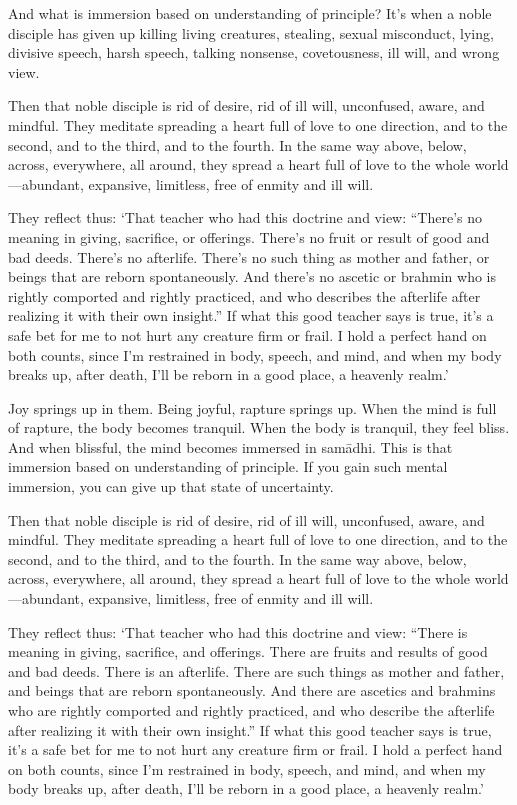 \documentclass[12pt,openany]{book}%
\begin{document}
And what is immersion based on understanding of principle? It’s when a noble disciple has given up killing living creatures, stealing, sexual misconduct, lying, divisive speech, harsh speech, talking nonsense, covetousness, ill will, and wrong view. 

Then that noble disciple is rid of desire, rid of ill will, unconfused, aware, and mindful. They meditate spreading a heart full of love to one direction, and to the second, and to the third, and to the fourth. In the same way above, below, across, everywhere, all around, they spread a heart full of love to the whole world—abundant, expansive, limitless, free of enmity and ill will. 

They reflect thus: ‘That teacher who had this doctrine and view: “There’s no meaning in giving, sacrifice, or offerings. There’s no fruit or result of good and bad deeds. There’s no afterlife. There’s no such thing as mother and father, or beings that are reborn spontaneously. And there’s no ascetic or brahmin who is rightly comported and rightly practiced, and who describes the afterlife after realizing it with their own insight.” If what this good teacher says is true, it’s a safe bet for me to not hurt any creature firm or frail. I hold a perfect hand on both counts, since I’m restrained in body, speech, and mind, and when my body breaks up, after death, I’ll be reborn in a good place, a heavenly realm.’ 

Joy springs up in them. Being joyful, rapture springs up. When the mind is full of rapture, the body becomes tranquil. When the body is tranquil, they feel bliss. And when blissful, the mind becomes immersed in \textsanskrit{samādhi}. This is that immersion based on understanding of principle. If you gain such mental immersion, you can give up that state of uncertainty. 

Then that noble disciple is rid of desire, rid of ill will, unconfused, aware, and mindful. They meditate spreading a heart full of love to one direction, and to the second, and to the third, and to the fourth. In the same way above, below, across, everywhere, all around, they spread a heart full of love to the whole world—abundant, expansive, limitless, free of enmity and ill will. 

They reflect thus: ‘That teacher who had this doctrine and view: “There is meaning in giving, sacrifice, and offerings. There are fruits and results of good and bad deeds. There is an afterlife. There are such things as mother and father, and beings that are reborn spontaneously. And there are ascetics and brahmins who are rightly comported and rightly practiced, and who describe the afterlife after realizing it with their own insight.” If what this good teacher says is true, it’s a safe bet for me to not hurt any creature firm or frail. I hold a perfect hand on both counts, since I’m restrained in body, speech, and mind, and when my body breaks up, after death, I’ll be reborn in a good place, a heavenly realm.’ 
\end{document}
